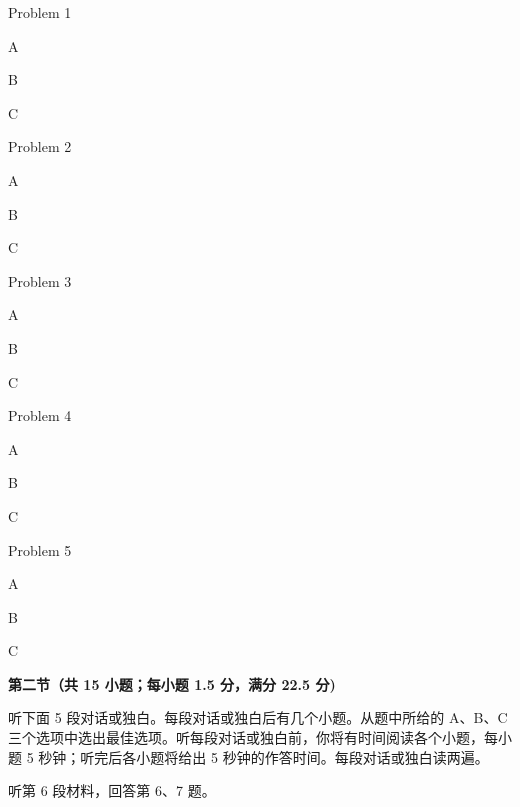 \documentclass{exam-zh}
\begin{document}
\begin{question}
Problem 1
\begin{choices}
\item A
\item B
\item C
\end{choices}
\end{question}

\begin{question}
Problem 2
\begin{choices}
\item A
\item B
\item C
\end{choices}
\end{question}

\begin{question}
Problem 3
\begin{choices}
\item A
\item B
\item C
\end{choices}
\end{question}

\begin{question}
Problem 4
\begin{choices}
\item A
\item B
\item C
\end{choices}
\end{question}

\begin{question}
Problem 5
\begin{choices}
\item A
\item B
\item C
\end{choices}
\end{question}

\begin{flushleft}
{\bfseries 第二节（共 15 小题；每小题 1.5 分，满分 22.5 分)}
\end{flushleft}

听下面 5 段对话或独白。每段对话或独白后有几个小题。从题中所给的 A、B、C 三个选项中选出最佳选项。听每段对话或独白前，你将有时间阅读各个小题，每小题 5 秒钟；听完后各小题将给出 5 秒钟的作答时间。每段对话或独白读两遍。

\begin{flushleft}
听第 6 段材料，回答第 6、7 题。
\end{flushleft}
\end{document}
